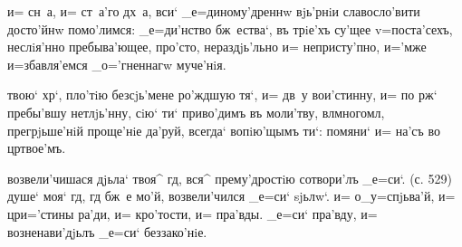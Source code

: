    и= сн~а, и= ст~а'го 
дх~а, вси` _е=диному'дреннw вjь'рнiи славосло'вити 
досто'йнw помо'лимся: _е=ди'нство бж~ества`, въ трiе'хъ 
су'щее v=поста'сехъ, неслiя'нно пребыва'ющее, про'сто, 
нераздjь'льно и= непристу'пно, и='мже и=збавля'емся 
_о='гненнагw муче'нiя.

    твою` хр`, 
пло'тiю без\ъ сjь'мене ро'ждшую тя`, и= дв~у вои'стинну, 
и= по рж` пребы'вшу нетлjь'нну, сiю` ти` приво'димъ 
въ моли'тву, вл многомл, прегрjьше'нiй 
проще'нiе да'руй, всегда` вопiю'щымъ ти`: помяни` и= 
на'съ во цр твое'мъ.

    возвели'чишася 
дjьла` твоя^ гд, вся^ прему'дростiю сотвори'лъ _е=си`. 
(с. 529)   душе` моя` гд, гд 
бж~е мо'й, возвели'чился _е=си` sjьлw`.   и= о_у=спjьва'й, и= цр и='стины ра'ди, 
и= кро'тости, и= пра'вды.   _е=си` 
пра'вду, и= возненави'дjьлъ _е=си` беззако'нiе.

